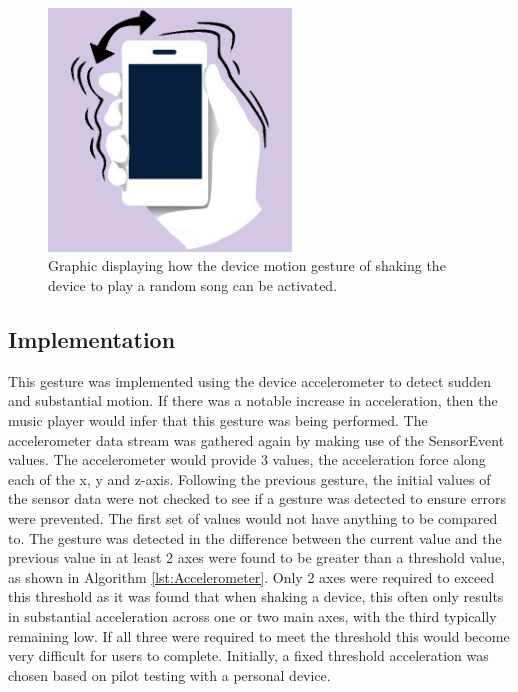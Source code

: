 \documentclass{l4proj}
\begin{document}
\begin{figure}[h!]
    \centering
    \includegraphics[width=0.575\textwidth]{images/shaking.png}
        \caption{Graphic displaying how the device motion gesture of shaking the device to play a random song can be activated.}
        \label{fig:Dev-Mot}
\end{figure}

\subsection{Implementation}
This gesture was implemented using the device accelerometer to detect sudden and substantial motion. If there was a notable increase in acceleration, then the music player would infer that this gesture was being performed. The accelerometer data stream was gathered again by making use of the SensorEvent values. The accelerometer would provide 3 values, the acceleration force along each of the x, y and z-axis. Following the previous gesture, the initial values of the sensor data were not checked to see if a gesture was detected to ensure errors were prevented. The first set of values would not have anything to be compared to. The gesture was detected in the difference between the current value and the previous value in at least 2 axes were found to be greater than a threshold value, as shown in Algorithm \ref{lst:Accelerometer}. Only 2 axes were required to exceed this threshold as it was found that when shaking a device, this often only results in substantial acceleration across one or two main axes, with the third typically remaining low. If all three were required to meet the threshold this would become very difficult for users to complete. Initially, a fixed threshold acceleration was chosen based on pilot testing with a personal device.
\end{document}

